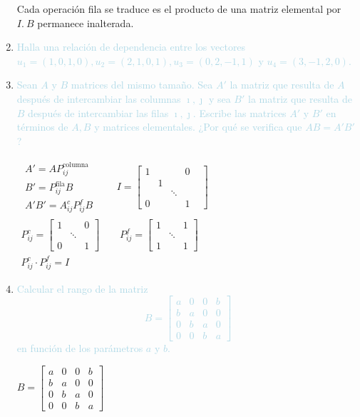 \begin{enumerate}[label=\color{red}\textbf{\arabic*)},leftmargin=*]
	Cada operación fila se traduce es el producto de una matriz elemental por $I.\:B$ permanece inalterada.
	\item \textcolor{lightblue}{Halla una relación de dependencia entre los vectores $u_1=(1,0,1,0),u_2=(2,1,0,1),u_3=(0,2,-1,1)$ y $u_4=(3,-1,2,0)$.}
	\item \textcolor{lightblue}{Sean $A$ y $B$ matrices del mismo tamaño. Sea $A'$ la matriz que resulta de $A$ después de intercambiar las columnas $\imath,\jmath$ y sea $B'$ la matriz que resulta de $B$ después de intercambiar las filas $\imath,\jmath$. Escribe las matrices $A'$ y $B'$ en términos de $A,B$ y matrices elementales. ¿Por qué se verifica que $AB=A'B'$?}
	
	$\begin{array}{l}
		\begin{array}{l}
		A'=AP_{ij}^{\mathrm{columna}}\\
		B'=P_{ij}^{\mathrm{fila}}B\\
		A'B'=A_{ij}^cP_{ij}^fB
	\end{array}\qquad I=\begin{bmatrix}
	1 & & & 0\\
	 &1 & &  &\\
	 & & \ddots & \\
	 0 & & & 1
	\end{bmatrix}\\
	P_{ij}^c=\begin{bmatrix}
		1 & & 0\\
		&\ddots &  \\
		0 & & 1
	\end{bmatrix}\qquad P_{ij}^f=\begin{bmatrix}
	1 & & 1\\
	&\ddots & \\
	1 & & 1
	\end{bmatrix}\\
	P_{ij}^c\cdot P_{ij}^f=I
	\end{array}$
	\item \textcolor{lightblue}{Calcular el rango de la matriz \[ B=\begin{bmatrix}
			a & 0 & 0 & b \\
			b & a & 0 & 0 \\
			0 & b & a & 0 \\
			0 & 0 & b & a
		\end{bmatrix} \] en función de los parámetros $a$ y $b$.}
	
	$B=\begin{bmatrix}
		a & 0 & 0 & b \\
		b & a & 0 & 0 \\
		0 & b & a & 0 \\
		0 & 0 & b & a
	\end{bmatrix}$
	

\end{enumerate}

